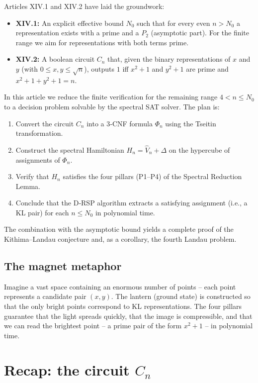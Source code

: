 \documentclass[11pt,a4paper]{article}
\begin{document}
Articles XIV.1 and XIV.2 have laid the groundwork:
\begin{itemize}
\item \textbf{XIV.1:} An explicit effective bound \(N_0\) such that for every even \(n>N_0\) a representation exists with a prime and a \(P_2\) (asymptotic part). For the finite range we aim for representations with both terms prime.
\item \textbf{XIV.2:} A boolean circuit \(C_n\) that, given the binary representations of \(x\) and \(y\) (with \(0\le x,y\le \sqrt{n}\)), outputs \(1\) iff \(x^2+1\) and \(y^2+1\) are prime and \(x^2+1+y^2+1=n\).
\end{itemize}
In this article we reduce the finite verification for the remaining range \(4<n\le N_0\) to a decision problem solvable by the spectral SAT solver. The plan is:
\begin{enumerate}
\item Convert the circuit \(C_n\) into a 3‑CNF formula \(\Phi_n\) using the Tseitin transformation.
\item Construct the spectral Hamiltonian \(H_n = \hat{V}_n + \Delta\) on the hypercube of assignments of \(\Phi_n\).
\item Verify that \(H_n\) satisfies the four pillars (P1–P4) of the Spectral Reduction Lemma.
\item Conclude that the D‑RSP algorithm extracts a satisfying assignment (i.e., a KL pair) for each \(n\le N_0\) in polynomial time.
\end{enumerate}
The combination with the asymptotic bound yields a complete proof of the Kithima–Landau conjecture and, as a corollary, the fourth Landau problem.

\subsection{The magnet metaphor}

Imagine a vast space containing an enormous number of points – each point represents a candidate pair \((x,y)\). The lantern (ground state) is constructed so that the only bright points correspond to KL representations. The four pillars guarantee that the light spreads quickly, that the image is compressible, and that we can read the brightest point – a prime pair of the form \(x^2+1\) – in polynomial time.

\section{Recap: the circuit \(C_n\)}
\end{document}
